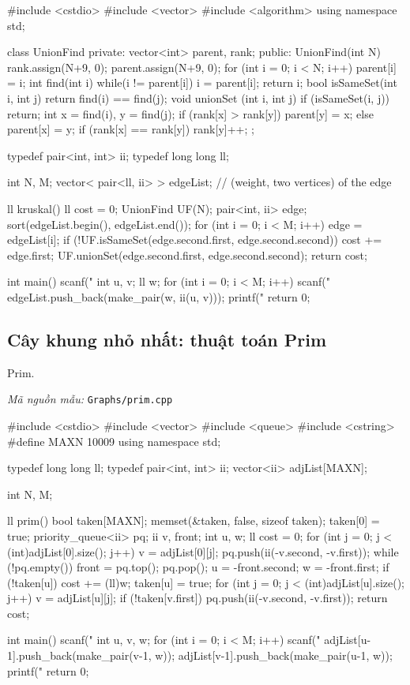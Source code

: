 \documentclass[11pt]{article}
\newcommand{\codepath}[1]{\par\noindent\textit{Mã nguồn mẫu:} \texttt{#1}\par}
\begin{document}
\begingroup\scriptsize
\begin{vncode}
#include <cstdio>
#include <vector>
#include <algorithm>
using namespace std;

class UnionFind {
private:
	vector<int> parent, rank;
public:
	UnionFind(int N) {
		rank.assign(N+9, 0);
		parent.assign(N+9, 0);
		for (int i = 0; i < N; i++) parent[i] = i;
	}
	int find(int i) {
		while(i != parent[i]) i = parent[i];
		return i;
	}
	bool isSameSet(int i, int j) {
		return find(i) == find(j);
	}
	void unionSet (int i, int j) {
		if (isSameSet(i, j)) return;
		int x = find(i), y = find(j);
		if (rank[x] > rank[y]) parent[y] = x;
		else {
			parent[x] = y;
			if (rank[x] == rank[y]) rank[y]++;
		}
	}
};

typedef pair<int, int> ii;
typedef long long ll;

int N, M;
vector< pair<ll, ii> > edgeList; // (weight, two vertices) of the edge

ll kruskal() {
	ll cost = 0;
	UnionFind UF(N);
	pair<int, ii> edge;
	sort(edgeList.begin(), edgeList.end());
	for (int i = 0; i < M; i++) {
		edge = edgeList[i];
		if (!UF.isSameSet(edge.second.first, edge.second.second)) { 
			cost += edge.first;
			UF.unionSet(edge.second.first, edge.second.second);
		}
	}
	return cost;
}

int main() {
	scanf("%
	int u, v; ll w;
	for (int i = 0; i < M; i++) {
		scanf("%
		edgeList.push_back(make_pair(w, ii(u, v)));
	}
	printf("%
	return 0;
}
\end{vncode}
\endgroup


\subsection{Cây khung nhỏ nhất: thuật toán Prim}

Prim.

\codepath{Graphs/prim.cpp}

\begingroup\scriptsize
\begin{vncode}
#include <cstdio>
#include <vector>
#include <queue>
#include <cstring>
#define MAXN 10009
using namespace std;

typedef long long ll;
typedef pair<int, int> ii;
vector<ii> adjList[MAXN];

int N, M;

ll prim() {
	bool taken[MAXN];
	memset(&taken, false, sizeof taken);
	taken[0] = true;
	priority_queue<ii> pq;
	ii v, front; int u, w; ll cost = 0;
	for (int j = 0; j < (int)adjList[0].size(); j++) {
		v = adjList[0][j];
		pq.push(ii(-v.second, -v.first));
	}
	while (!pq.empty()) {
		front = pq.top(); pq.pop();
		u = -front.second; w = -front.first;
		if (!taken[u]) {
			cost += (ll)w; taken[u] = true;
			for (int j = 0; j < (int)adjList[u].size(); j++) {
				v = adjList[u][j];
				if (!taken[v.first]) pq.push(ii(-v.second, -v.first));
			}
		}
	}
	return cost;
}

int main() {
	scanf("%
	int u, v, w;
	for (int i = 0; i < M; i++) {
		scanf("%
		adjList[u-1].push_back(make_pair(v-1, w));
		adjList[v-1].push_back(make_pair(u-1, w));
	}
	printf("%
	return 0;
}
\end{vncode}
\endgroup
\end{document}
